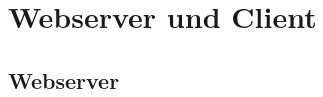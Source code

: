 \section{Webserver und Client}
\label{sec:webserver-und-client}
\blindtext

\subsection{Webserver}
\label{sec:webserver}
\blindtext
